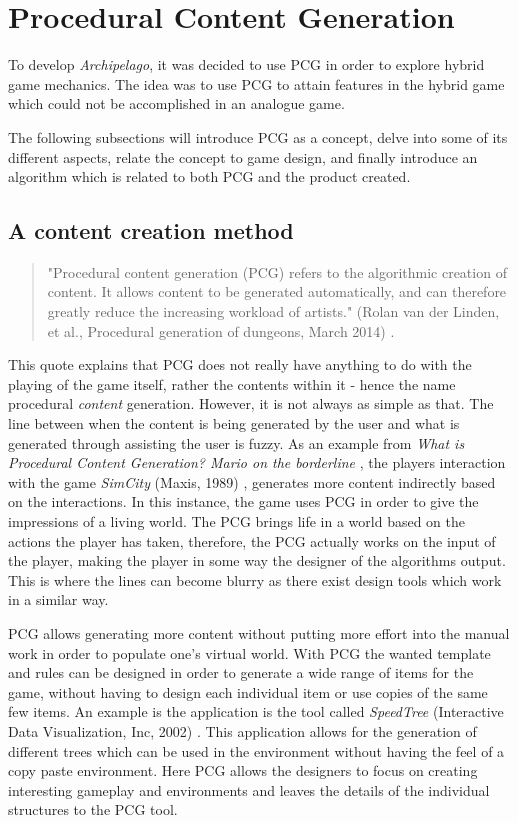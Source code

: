 \section{Procedural Content Generation}
To develop \textit{Archipelago}, it was decided to use PCG in order to explore hybrid game mechanics. The idea was to use PCG to attain features in the hybrid game which could not be accomplished in an analogue game.

The following subsections will introduce PCG as a concept, delve into some of its different aspects, relate the concept to game design, and finally introduce an algorithm which is related to both PCG and the product created.

\subsection{A content creation method}
\begin{quotation}
"Procedural content generation (PCG) refers to the algorithmic creation of content. It allows content to be generated automatically, and can therefore greatly reduce the increasing workload of artists." (Rolan van der Linden, et al., Procedural generation of dungeons, March 2014) \cite{art:pcg}. 
\end{quotation}
This quote explains that PCG does not really have anything to do with the playing of the game itself, rather the contents within it - hence the name procedural \textit{content} generation. 
However, it is not always as simple as that. The line between when the content is being generated by the user and what is generated through assisting the user is fuzzy.
As an example from \textit{What is Procedural Content Generation? Mario on the borderline} \cite{art:whatpcg}, the players interaction with the game \textit{SimCity} (Maxis, 1989) \cite{game:sc}, generates more content indirectly based on the interactions.
In this instance, the game uses PCG in order to give the impressions of a living world. The PCG brings life in a world based on the actions the player has taken, therefore, the PCG actually works on the input of the player, making the player in some way the designer of the algorithms output. This is where the lines can become blurry as there exist design tools which work in a similar way. 

PCG allows generating more content without putting more effort into the manual work in order to populate one's virtual world. With PCG the wanted template and rules can be designed in order to generate a wide range of items for the game, without having to design each individual item or use copies of the same few items. An example is the application is the tool called \textit{SpeedTree} (Interactive Data Visualization, Inc, 2002) \cite{soft:speedtree}. This application allows for the generation of different trees which can be used in the environment without having the feel of a copy paste environment. Here PCG allows the designers to focus on creating interesting gameplay and environments and leaves the details of the individual structures to the PCG tool. 

